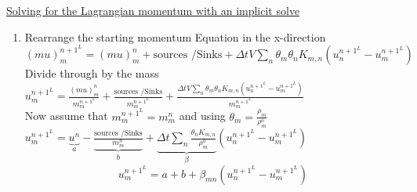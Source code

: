 \documentclass[fleqn]{article}
\newcommand{\rhoM}      {\ensuremath{\rho^{o}_m}}
\newcommand{\delt}      {\ensuremath{\Delta{t}} }
\begin{document}
\newpage
\underline{Solving for the Lagrangian momentum with an implicit solve}

\begin{enumerate}
\item Rearrange the starting momentum Equation in the x-direction \\
$  (mu)^{n+1^{L}}_m 
    = (m u)_m^{n}
    + \text{sources /Sinks}
    + \delt V \sum_n \theta_m \theta_n K_{m,n} (u_n^{n+1^{L}} - u_m^{n+1^{L}})
$\\
Divide through by the mass\\
$   u^{n+1^{L}}_m 
    = \frac{(m u)_m^{n} }{m^{n+1^{L}}_m}
    + \frac{\text{sources /Sinks} }{m^{n+1^{L}}_m}
    + \frac{\delt V \sum_n \theta_m \theta_n K_{m,n} (u_n^{n+1^{L}} - u_m^{n+1^{L}})}{m^{n+1^{L}}_m}
$\\ 
Now assume that $m^{n+1^{L}}_m = m^{n}_m$ and using $\theta_m = \frac{\rho_m}{\rhoM}$\\
$    u^{n+1^{L}}_m 
    = \underbrace{ u^{n}  }_a
    - \underbrace{\frac{\text{sources /Sinks} }{m^{n}_m}}_b
    + \underbrace{\delt\sum_n \frac{\theta_n K_{m,n}}{\rhoM} }_\beta  (u_n^{n+1^{L}} - u_m^{n+1^{L}})
$
\[
    u^{n+1^{L}}_m 
    = a
    + b
    + \beta_{mn}  (u_n^{n+1^{L}} - u_m^{n+1^{L}})
\]


\end{enumerate}
\end{document}
